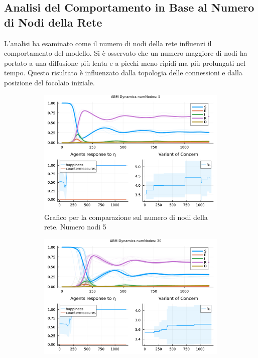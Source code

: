 \subsection{Analisi del Comportamento in Base al Numero di Nodi della Rete}

L'analisi ha esaminato come il numero di nodi della rete influenzi 
il comportamento del modello. Si è osservato che un numero maggiore
 di nodi ha portato a una diffusione più lenta e a picchi meno 
 ripidi ma più prolungati nel tempo. Questo risultato è influenzato 
 dalla topologia delle connessioni e dalla posizione del focolaio iniziale.

\begin{figure}[!hb]
	\centering
	\begin{subfigure}[b]{0.45\textwidth}
		\centering
		\includegraphics[width=\textwidth]{img/SocialNetworkABM_1_NN.pdf}
		\caption{Grafico per la comparazione sul numero di nodi della rete. Numero nodi 5}
		\label{fig:comparison_numberOfNodes_5}
	\end{subfigure}
	\hfill
	\begin{subfigure}[b]{0.45\textwidth}
		\centering
		\includegraphics[width=\textwidth]{img/SocialNetworkABM_2_NN.pdf}

\end{subfigure}
\end{figure}
